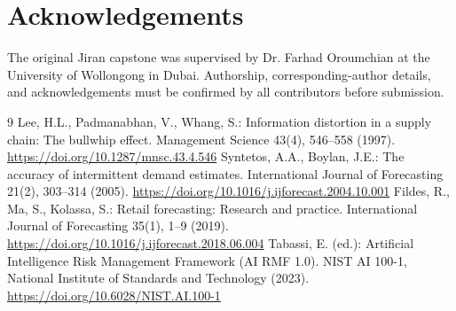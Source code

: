 \documentclass[graybox]{svmult}
\begin{document}
\section*{Acknowledgements}
The original Jiran capstone was supervised by Dr. Farhad Oroumchian at the University of Wollongong in Dubai. Authorship, corresponding-author details, and acknowledgements must be confirmed by all contributors before submission.

\begin{thebibliography}{9}
 Lee, H.L., Padmanabhan, V., Whang, S.: Information distortion in a supply chain: The bullwhip effect. Management Science 43(4), 546--558 (1997). \url{https://doi.org/10.1287/mnsc.43.4.546}
 Syntetos, A.A., Boylan, J.E.: The accuracy of intermittent demand estimates. International Journal of Forecasting 21(2), 303--314 (2005). \url{https://doi.org/10.1016/j.ijforecast.2004.10.001}
 Fildes, R., Ma, S., Kolassa, S.: Retail forecasting: Research and practice. International Journal of Forecasting 35(1), 1--9 (2019). \url{https://doi.org/10.1016/j.ijforecast.2018.06.004}
 Tabassi, E. (ed.): Artificial Intelligence Risk Management Framework (AI RMF 1.0). NIST AI 100-1, National Institute of Standards and Technology (2023). \url{https://doi.org/10.6028/NIST.AI.100-1}
\end{thebibliography}
\end{document}
